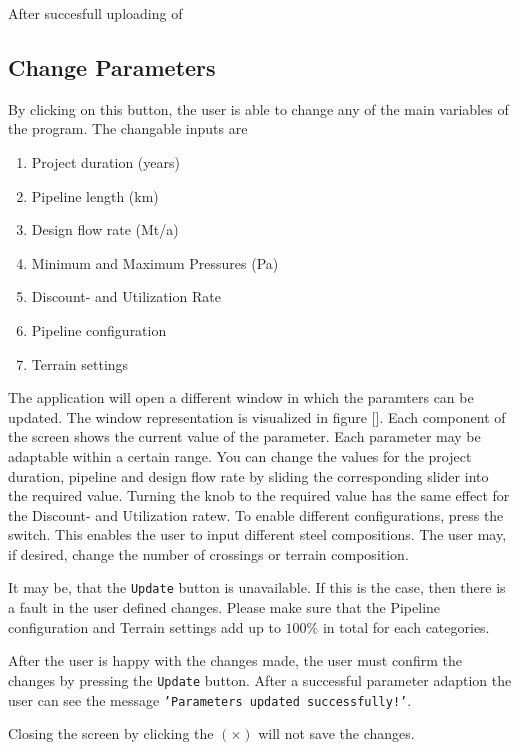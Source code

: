 \documentclass{article}
\begin{document}
After succesfull uploading of 

\subsection{Change Parameters}
By clicking on this button, the user is able to change any of the main variables of the program. The changable inputs are
\begin{enumerate}
	\item Project duration (years) 
	\item Pipeline length (km) 
	\item Design flow rate (Mt/a) 
	\item Minimum and Maximum Pressures (Pa) 
	\item Discount- and Utilization Rate 
	\item Pipeline configuration 
	\item Terrain settings
\end{enumerate}

The application will open a different window in which the paramters can be updated. The window representation is visualized in figure []. Each component of the screen shows the current value of the parameter. Each parameter may be adaptable within a certain range. You can change the values for the project duration, pipeline and design flow rate by sliding the corresponding slider into the required value. Turning the knob to the required value has the same effect for the Discount- and Utilization ratew. To enable different configurations, press the switch. This enables the user to input different steel compositions. The user may, if desired, change the number of crossings or terrain composition.
\begin{info}
	It may be, that the \texttt{Update} button is unavailable. If this is the case, then there is a fault in the user defined changes. Please make sure that the Pipeline configuration and Terrain settings add up to $100\%$ in total for each categories.
\end{info}
 After the user is happy with the changes made, the user must confirm the changes by pressing the \texttt{Update} button. After a successful parameter adaption the user can see the message \texttt{'Parameters updated successfully!'}. 
\begin{warn}
	Closing the screen by clicking the $(\times)$ will not save the changes.
\end{warn}
\end{document}
